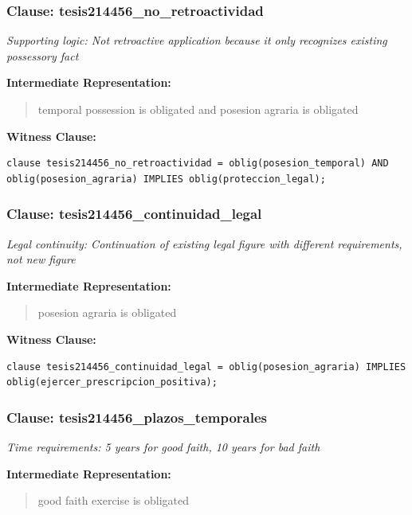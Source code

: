 \documentclass[11pt,a4paper]{article}
\begin{document}
\subsubsection{Clause: tesis214456\_no\_retroactividad}

\textit{Supporting logic: Not retroactive application because it only recognizes existing possessory fact}

\textbf{Intermediate Representation:}

\begin{quote}
temporal possession is obligated and posesion agraria is obligated
\end{quote}

\textbf{Witness Clause:}

\begin{lstlisting}[style=witnessstyle, language=Witness]
clause tesis214456_no_retroactividad = oblig(posesion_temporal) AND oblig(posesion_agraria) IMPLIES oblig(proteccion_legal);
\end{lstlisting}

\subsubsection{Clause: tesis214456\_continuidad\_legal}

\textit{Legal continuity: Continuation of existing legal figure with different requirements, not new figure}

\textbf{Intermediate Representation:}

\begin{quote}
posesion agraria is obligated
\end{quote}

\textbf{Witness Clause:}

\begin{lstlisting}[style=witnessstyle, language=Witness]
clause tesis214456_continuidad_legal = oblig(posesion_agraria) IMPLIES oblig(ejercer_prescripcion_positiva);
\end{lstlisting}

\subsubsection{Clause: tesis214456\_plazos\_temporales}

\textit{Time requirements: 5 years for good faith, 10 years for bad faith}

\textbf{Intermediate Representation:}

\begin{quote}
good faith exercise is obligated
\end{quote}
\end{document}
